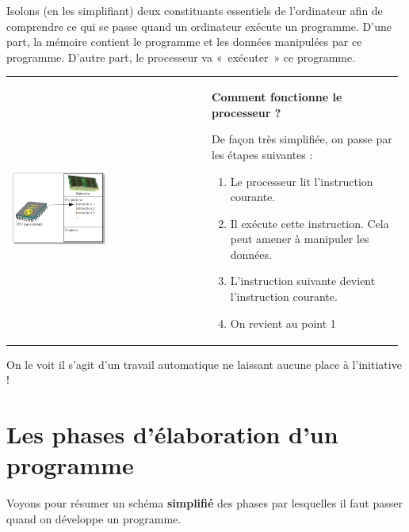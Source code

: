 		Isolons (en les simplifiant) deux constituants essentiels de
		l'ordinateur afin de comprendre ce qui se passe quand
		un ordinateur exécute un programme. D'une part, la
		mémoire contient le programme et les données manipulées par ce
		programme. D'autre part, le processeur va «~exécuter~»
		ce programme.

		\begin{tabular}{m{0.50\linewidth}m{0.48\linewidth}}
			\begin{center}
			\includegraphics[width=0.5\textwidth]{image/intro-schema-ordi}
			\end{center}
		&
			\textbf{Comment fonctionne le processeur ?}
	
			De façon très simplifiée, on passe par les étapes suivantes :
	
			\begin{enumerate}
			\item Le processeur lit l'instruction courante.
			\item Il exécute cette instruction. Cela peut amener à manipuler les données.
			\item L'instruction suivante devient l'instruction courante.
			\item On revient au point 1
			\end{enumerate}
		\\
		\end{tabular}

		On le voit il s'agit d'un travail
		automatique ne laissant aucune place à l'initiative !

\section{Les phases d'élaboration d'un programme}

	Voyons pour résumer un schéma \textbf{simplifié} des phases par
	lesquelles il faut passer quand on développe un programme.

